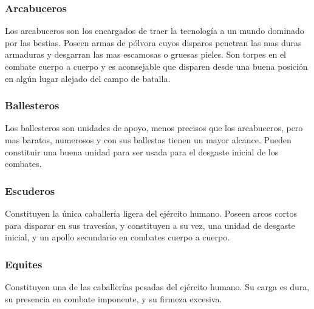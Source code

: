 
\subsubsection*{Arcabuceros}
Los arcabuceros son los encargados de traer la tecnología a un mundo
dominado por las bestias. Poseen armas de pólvora cuyos disparos
penetran las mas duras armaduras y desgarran las mas escamosas o
gruesas pieles. Son torpes en el combate cuerpo a cuerpo y es
aconsejable que disparen desde una buena posición en algún lugar
alejado del campo de batalla.


\subsubsection*{Ballesteros}
Los ballesteros son unidades de apoyo, menos precisos que los
arcabuceros, pero mas baratos, numerosos y con sus ballestas tienen un
mayor alcance. Pueden constituir una buena unidad para ser usada para el
desgaste inicial de los combates.


\subsubsection*{Escuderos}
Constituyen la única caballería ligera del ejército humano. Poseen
arcos cortos para disparar en sus travesías, y constituyen a su vez,
una unidad de desgaste inicial, y un apollo secundario en combates
cuerpo a cuerpo.


\subsubsection*{Equites}
Constituyen una de las caballerías pesadas del ejército humano. Su
carga es dura, su presencia en combate imponente, y su firmeza excesiva.


